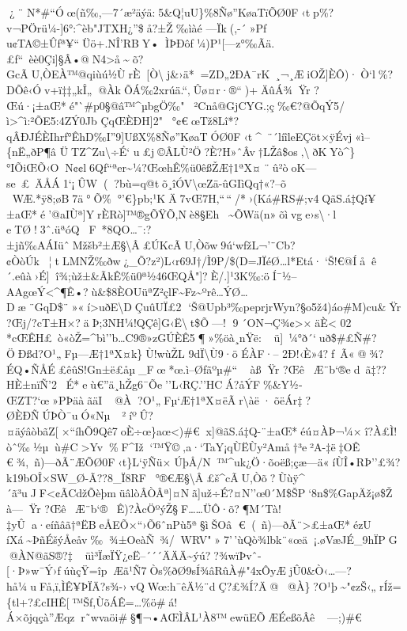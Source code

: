 ¿¨
N*\#``Óœ(ñ‰,---7´æ²äýä:5\&Q¦uU\}\%8Ñø''KøaTïÕØ0F‹tp\%?v¬PÖrü¼-{]}6°:\^{}èb"JTXH¿''\$å?±Ž‰ìàé
---Ïk(,-´»Pƒ
u¢TA©±Ûƒª¥``Üö+.NÎ'RBY•ÌÞÐôf¼)P¹{[}---z°‰Ãä.£ƒ``~èè0Çi{]}§Â•@N4\textgreater å\textasciitildeõ?GcÃU,ÒEÀ™@qiùú½ÙrÈ{[}Ò\textbackslashj\&›ä*=Z\textquotesingle D„2ÐA¯rK~¸¬¸ÆiOŽ{]}ÈÔ)·Ò\textbar`l\%?DÕê‹Óv+ï‡‡„kÎ„@ÀkÕÁ‰2xrúä.``‚Ûø¤r·®``)+ÄûÁ¾Ÿr
?Œú·¡±aŒ*é"`\#p0§@â™\^{}µbgÖ‰"²Cnå@GjCYG.;ç‰€?@ÕqÝ5/ì\textgreater\^{}ì:²ÕE5:4ZÝ0Jb
ÇqŒÈÐH{]}2"°¢€œTž8Lî*?qÂÐJÉÈIhrƒ°ÊhD‰I''9{]}UßX\%8Ñø''KøaTÓØ0F‹t\^{}~¨´líîleEÇöt×ÿÉvj«ì--\{nË„ðP¶â
ÜTZ\^{}Zu\textbackslash÷É`
u£j©ÂLÙ²Ö?È?H»ˆÂv†LŽâ\$os‚\textbackslashðKYò\^{}\}°IÕiŒÕ‹ON¢¢l6Qƒ``ªe\textquotesingle r\textasciitilde¼?Œœh\textbar Ê\%ü0êßŽÆ†1ªX¤¨û²òoK---se~£~ÄÅÁ1`¡ÛW(?bù=q@tõ¸îÓV\textbackslash œZä-ûGIìQq†«?--õ~
WÆ.*ÿ8;øB7\textbar ä°Õ\%°'€\}pb;¹KÄ7vŒ7H‚``\,``/*›(Ká\#RS\#;v4QãS.á‡Qí¥±aŒ*é'@aIÙª{]}YrÈRò{]}™®gÕŸÕ,Nè8§E\textbar h\textasciitilde ÕWä(n»õìvge›s\textbackslash·l
eTØ\textbar!3ˆ.üªóQF~*8QO\ldots¯:?±jñ‰AÁIüˆMžšb²±Æ§\textbackslash Â£ÚKcÃU,Òõw9ú`wfžL¬'¨Cb?¢ÒòÚk¦tLMNŽ‰ðw¿­\_Õ?z²)­L‹r69J†/Ì9P/\$(D=JÏéØ\ldots l*Etá·`Š!€@Íåê´.eûà›É{]}\textquotesingle î¾;ùž±\&Ãk\textbar Ê\%ü0ª½46ŒQÅ"{]}?È/.{]}¹3K‰:öÍ¯½--AAgœÝ\textless\^{}¶Ê•?ù\&\$8ÈOUüªZ²çlF\textasciitilde Fz\textasciitilde ºrê\ldots ÝØ\ldots Dæ¨\textquotesingle Gq\textquotesingle D\$¨»«í\textgreater uðE\textbackslash DÇuûUÏ£2
`Š@Upb³‰peprjrWyn?§o5ž4)áo\#M)cu\&Ÿr
?Œj/?cT±H×?äÞ;3NH¼!QÇê{]}G‹Ë\textbackslash{}t\$Õ---!
9´ON¬Ç¾¢\textgreater×äÈ\textless{} 02
*cŒÊH£~ò«òŽ\textbar=\^{}bì''b\ldots C9®»zGÚÈÊ5¶»\%öà¸nŸë:ü{]}~¼°ð´`uð\$\#£Ñ\#?ÖÐßd ?O¹„Fµ---Æ†1ªX¤k\}Ù!wùŽL
9dÏ\textbackslash Ù9·ö ÉÀF·--
2Ð!‹È»4?f~Ã«@¾?ÉQ•ÑÅÉ£êûS!Gn±ë£åµ\_F\textquotesingleœ*œ.ì--Øƒãºµ\#``
àßŸr
?ŒêÆ¨b`®ed~ã‡??HÈ±nïÑ'2É*eù€''ä¸hŽg6¯Õe''L‹RÇ.''HCÁ?åÝF\%\&Y½­ŒZT?{}`œ»PÞäàãäI@À?O¹„Fµ`Æ†1ªX¤ëÃr\textbackslash àë·õëÁr‡?ØÈÐÑÚÞÒ¯uÓ«Nµ~²­íºÛ?¤äýâòbãZ{[}×``íhÕ9Qê7oÈ÷œ\}aœ\textless)\#€ x{]}@ãS.á‡Q-¨±aŒ*éú¤ÀÞ¬¼×î?À£Ì!òˆ‰½µù\#C\textgreater Yv\%F\^{}Iž`™Ÿ©‚a·`TaY¡qÙËÙy²Amå†³e²A-‡ë‡OÊ
€ ¾,~ñ)---ðÃ¨ÆÕØ0F‹t\}L`ÿÑü×ÚþÅ/N™\^{}uk¿Ö·õoëß;çæ---ä«íÙÎ•RÞ''£¾?k19bOÎ×SW\_Ø-Ã??8\_Ï8\textbar RF °®€Æ§\textbackslash Â£š\^{}cÃU,Òõ?Ùùÿ\^{}´ã³uJF\textless¢ÃCdžÕèþmüâlòÂÒÂª{]}¤Nã{]}už÷É?¤N''œ0´M\$ŠP`8n\$\%GapÄž¡ø\$Ž 
à---Ÿr
?ŒêÆ¨b`®Ê)?ÀcÖºýŽ§F\ldots\ldots ÜÔ·õ?¶M´Tà!‡yÛa·eíñâã†ªËBeÅEÕ×``›Õ6ˆnPù5ª§ìŠOâ
€ (~ñ)---ðÃ¨\textgreater£±aŒ*ézU
íXá\textasciitilde ÞñÉšýÅeåv‰¾±OeàÑ~¾/WRV"»7'\,'ùQò¾lbk¨«œä­¡.øVæJÉ\_9hÏP\textbarG @ÀN@ãS®?‡üì³ÏæÏŸ¿eË--´´´ÄÄÄ\textasciitilde ýú??¾wïÞvˆ­{[}·Þ»w¯Ý›ƒúùçŸ=îpÆã\textbar¹Ñ7Òs\%ðØ9sÍ¾âRûÀ\#"4xÔy­ÆjÛ0\&Ò‹\ldots---?hå¼uFå‚ï‚ÌÊ¥Þ\textquotesingle ÏÄ?s¾-›vQWœ:h¯êÄ½¨dÇ?£¾Í?Ä@ @À\}?O¹þ\textasciitilde{}"¢zŠ‹„rÍž=\{tl+?£cIHÊ{[}™\textquotesingle Šf,ÙõÁÊ=\ldots\%ö\#á!Á×õjqçà''Æqzr˜wvaöi\#§¶¬•AŒÌÂL¹À8™ewüEÕÆÉeßõÂê---;)\#€ 
